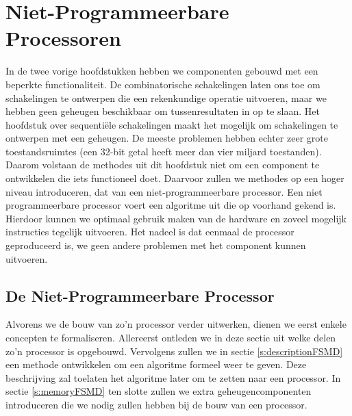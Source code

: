\chapter{Niet-Programmeerbare Processoren}
\begin{chapterintro}
In de twee vorige hoofdstukken hebben we componenten gebouwd met een beperkte functionaliteit. De combinatorische schakelingen laten ons toe om schakelingen te ontwerpen die een rekenkundige operatie uitvoeren, maar we hebben geen geheugen beschikbaar om tussenresultaten in op te slaan. Het hoofdstuk over sequenti\"ele schakelingen maakt het mogelijk om schakelingen te ontwerpen met een geheugen. De meeste problemen hebben echter zeer grote toestandsruimtes (een 32-bit getal heeft meer dan vier miljard toestanden). Daarom volstaan de methodes uit dit hoofdstuk niet om een component te ontwikkelen die iets functioneel doet. Daarvoor zullen we methodes op een hoger niveau introduceren, dat van een niet-programmeerbare processor. Een niet programmeerbare processor voert een algoritme uit die op voorhand gekend is. Hierdoor kunnen we optimaal gebruik maken van de hardware en zoveel mogelijk instructies tegelijk uitvoeren. Het nadeel is dat eenmaal de processor geproduceerd is, we geen andere problemen met het
component kunnen uitvoeren.
\end{chapterintro}
\minitoc[n]
\section{De Niet-Programmeerbare Processor}
Alvorens we de bouw van zo'n processor verder uitwerken, dienen we eerst enkele concepten te formaliseren. Allereerst ontleden we in deze sectie uit welke delen zo'n processor is opgebouwd. Vervolgens zullen we in sectie \ref{s:descriptionFSMD} een methode ontwikkelen om een algoritme formeel weer te geven. Deze beschrijving zal toelaten het algoritme later om te zetten naar een processor. In sectie \ref{s:memoryFSMD} ten slotte zullen we extra geheugencomponenten introduceren die we nodig zullen hebben bij de bouw van een processor.
